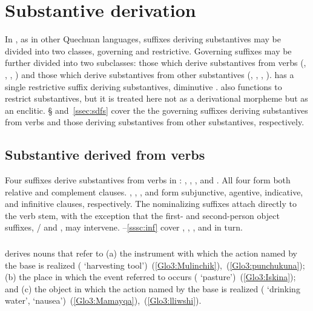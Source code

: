 \section{Substantive derivation}
In \SYQ, as in other Quechuan languages, suffixes deriving substantives may be divided into two classes, governing and restrictive. Governing suffixes may be further divided into two subclasses: those which derive substantives from verbs (, , , ) and those which derive substantives from other substantives (, , , ). \SYQ{} has a single restrictive suffix deriving substantives, diminutive .  also functions to restrict substantives, but it is treated here not as a derivational morpheme but as an enclitic. § and~\ref{ssec:sdfs} cover the the governing suffixes deriving substantives from verbs and those deriving substantives from other substantives, respectively.

\subsection{Substantive derived from verbs}\label{ssec:sdfv}
Four suffixes derive substantives from verbs in \SYQ{}: , , , and . All four form both relative and complement clauses. , , , and  form subjunctive, agentive, indicative, and infinitive clauses, respectively. The nominalizing suffixes attach directly to the verb stem, with the exception that the first- and second-person object suffixes, / and , may intervene. --\ref{sssc:inf} cover , , , and  in turn.

\subsubsection{}\label{sssc:con}
 derives nouns that refer to (a) the instrument with which the action named by the base is realized ( ‘harvesting tool’)~(\ref{Glo3:Mulinchik}),~(\ref{Glo3:punchukuna}); (b) the place in which the event referred to occurs ( ‘pasture’)~(\ref{Glo3:Iskina}); and (c) the object in which the action named by the base is realized ( ‘drinking water’,  ‘nausea’)~(\ref{Glo3:Mamayqa}),~(\ref{Glo3:lliwshi}).\\

